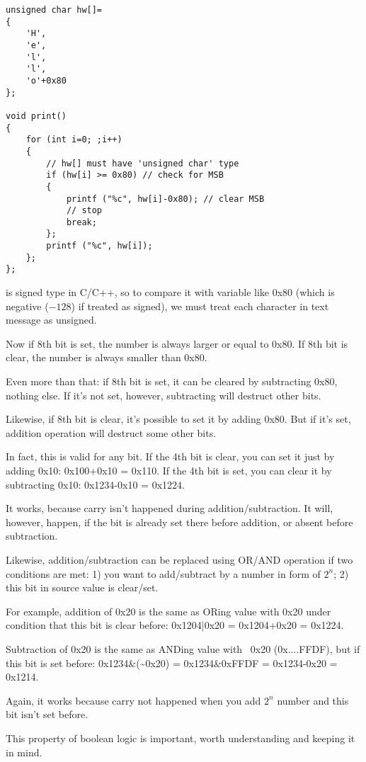 \begin{lstlisting}[style=customc]
unsigned char hw[]=
{
	'H',
	'e',
	'l',
	'l',
	'o'+0x80
};

void print()
{
	for (int i=0; ;i++)
	{
		// hw[] must have 'unsigned char' type
		if (hw[i] >= 0x80) // check for MSB
		{
			printf ("%c", hw[i]-0x80); // clear MSB
			// stop
			break;
		};
		printf ("%c", hw[i]);
	};
};
\end{lstlisting}

 is signed type in C/C++, so to compare it with variable like 0x80 (which is negative ($-128$)
if treated as signed),
we must treat each character in text message as unsigned.

Now if 8th bit is set, the number is always larger or equal to 0x80.
If 8th bit is clear, the number is always smaller than 0x80.

Even more than that: if 8th bit is set, it can be cleared by subtracting 0x80, nothing else.
If it's not set, however, subtracting will destruct other bits.

Likewise, if 8th bit is clear, it's possible to set it by adding 0x80.
But if it's set, addition operation will destruct some other bits.

In fact, this is valid for any bit.
If the 4th bit is clear, you can set it just by adding 0x10: 0x100+0x10 = 0x110.
If the 4th bit is set, you can clear it by subtracting 0x10: 0x1234-0x10 = 0x1224.

It works, because carry isn't happened during addition/subtraction.
It will, however, happen, if the bit is already set there before addition, or absent before subtraction.

Likewise, addition/subtraction can be replaced using OR/AND operation if two conditions are met:
1) you want to add/subtract by a number in form of $2^n$;
2) this bit in source value is clear/set.

For example, addition of 0x20 is the same as ORing value with 0x20 under condition that this bit is clear before:
0x1204|0x20 = 0x1204+0x20 = 0x1224.

Subtraction of 0x20 is the same as ANDing value with ~0x20 (0x....FFDF), but if this bit is set before:
0x1234\&(\~{}0x20) = 0x1234\&0xFFDF = 0x1234-0x20 = 0x1214.

Again, it works because carry not happened when you add $2^n$ number and this bit isn't set before.

This property of boolean logic is important, worth understanding and keeping it in mind.


